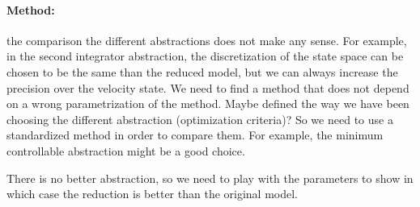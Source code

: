 \paragraph{Method:}
the comparison the different abstractions does not make any sense.
For example, in the second integrator abstraction, the discretization of the state space can be chosen to be the same than the reduced model, but we can always increase the precision over the velocity state.
We need to find a method that does not depend on a wrong parametrization of the method. Maybe defined the way we have been choosing the different abstraction (optimization criteria)?
So we need to use a standardized method in order to compare them.
For example, the minimum controllable abstraction might be a good choice.

There is no better abstraction, so we need to play with the parameters to show in which case the reduction is better than the original model.

